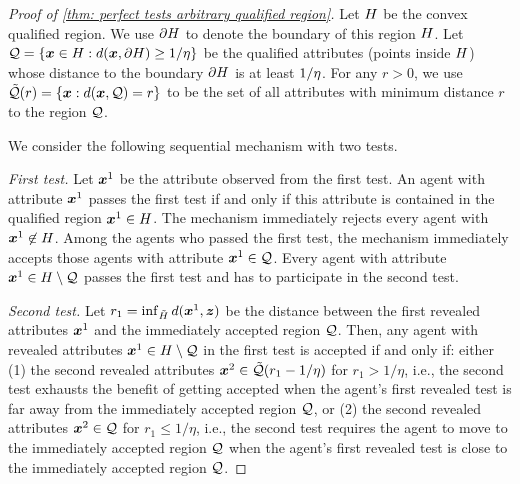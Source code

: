\begin{proof}[Proof of \cref{thm: perfect tests arbitrary qualified region}]
     Let $H$ be the convex qualified region. We use $\partial H$ to denote the boundary of this region $H$. 
    Let $\mathcal{Q} = \{\boldsymbol{x} \in H : d(\boldsymbol{x}, \partial H) \geq 1/\eta\}$ be the qualified attributes (points inside $H$) whose distance to the boundary $\partial H$ is at least $1/\eta$.
    For any $r > 0$, we use $\tilde {\mathcal{Q}}(r) = \{\boldsymbol{x}: d(\boldsymbol{x}, \mathcal{Q}) = r\}$ to be the set of all attributes with minimum distance $r$ to the region $\mathcal{Q}$.

 We consider the following sequential mechanism with two tests. 
    
    \emph{First test.}
    Let $\boldsymbol{x}^1$ be the attribute observed from the first test. 
    An agent with attribute $\boldsymbol{x}^1$ passes the first test if and only if this attribute is contained in the qualified region $\boldsymbol{x}^1 
    \in H$.
    The mechanism immediately rejects every agent with $\boldsymbol{x}^1 \not \in H$.
    Among the agents who passed the first test, the mechanism immediately accepts those agents with attribute $\boldsymbol{x}^1 \in \mathcal{Q}$. Every agent with attribute $\boldsymbol{x}^1 \in H \setminus \mathcal{Q}$ passes the first test and has to participate in the second test. 

    \emph{Second test.} 
    Let  $r_1 = \inf_{\tilde {H}} d(\boldsymbol{x}^1,\boldsymbol{z})$ be the distance between the first revealed attributes $\boldsymbol{x}^1$ and the immediately accepted region $\mathcal{Q}$.
    Then, any agent with revealed attributes $\boldsymbol{x}^1 \in H \setminus \mathcal{Q}$ in the first test is accepted if and only if:
    either (1) the second revealed attributes $\boldsymbol{x}^2 \in \tilde {\mathcal{Q}}(r_1 - 1/\eta)$ for $r_1 > 1/\eta$, i.e., the second test exhausts the benefit of getting accepted when the agent's first revealed test is far away from the immediately accepted region $\mathcal{Q}$, or (2) the second revealed attributes
    $\boldsymbol{x}^2 \in \mathcal{Q}$ for $r_1 \leq 1/\eta$, i.e., the second test requires the agent to move to the immediately accepted region $\mathcal{Q}$ when the agent's first revealed test is close to the immediately accepted region $\mathcal{Q}$.


\end{proof}
